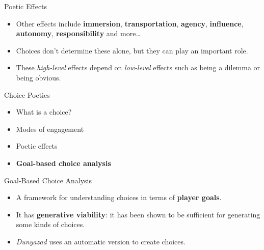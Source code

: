 \documentclass[xcolor=x11names]{beamer}
\def\dunyazad/{\textit{Dunyazad}}
\begin{document}
\begin{frame}{Poetic Effects}
  \begin{itemize}\addtolength{\itemsep}{0.5\baselineskip}
      \item Other effects include \textbf{immersion}, \textbf{transportation}, \textbf{agency}, \textbf{influence}, \textbf{autonomy}, \textbf{responsibility} and more\ldots
      \item Choices don't determine these alone, but they can play an important role.
      \item These \emph{high-level} effects depend on \emph{low-level} effects such as being a dilemma or being obvious.
  \end{itemize}
\end{frame}

\begin{frame}{Choice Poetics}
  \begin{itemize}\addtolength{\itemsep}{0.5\baselineskip}
      \item What is a choice?
      \item Modes of engagement
      \item Poetic effects
      \item \textbf{Goal-based choice analysis}
  \end{itemize}
\end{frame}

\begin{frame}{Goal-Based Choice Analysis}
  \begin{itemize}\addtolength{\itemsep}{0.5\baselineskip}
    \item A framework for understanding choices in terms of \textbf{player goals}.
    \item It has \textbf{generative viability}: it has been shown to be sufficient for generating some kinds of choices.
    \item \dunyazad/ uses an automatic version to create choices.
  \end{itemize}
\end{frame}
\end{document}

